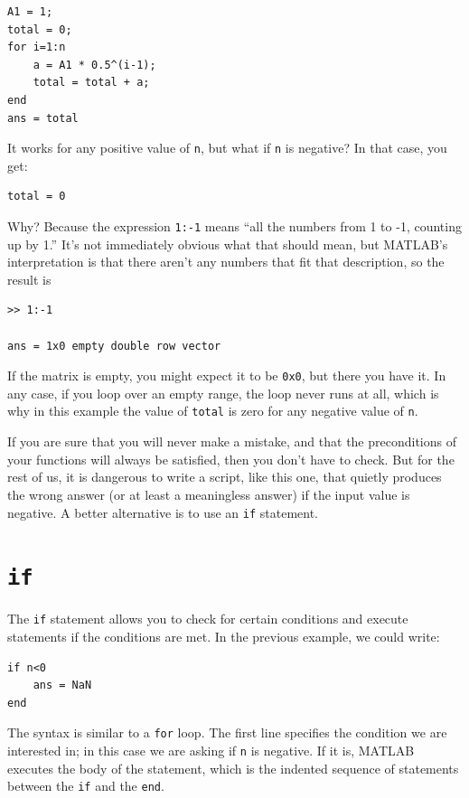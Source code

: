 \documentclass[
]{book}
\begin{document}
\begin{verbatim}
A1 = 1;
total = 0;
for i=1:n
    a = A1 * 0.5^(i-1);
    total = total + a;
end
ans = total
\end{verbatim}

It works for any positive value of {\tt n}, but what if {\tt n}
is negative?  In that case, you get:

\begin{verbatim}
total = 0
\end{verbatim}

Why?  Because the expression {\tt 1:-1} means ``all the numbers
from 1 to -1, counting up by 1.''  It's not immediately obvious
what that should mean, but MATLAB's interpretation is that there
aren't any numbers that fit that description, so the result is

\begin{verbatim}
>> 1:-1

ans = 1x0 empty double row vector
\end{verbatim}

If the matrix is empty, you might expect it to be {\tt 0x0}, but
there you have it.  In any case, if you loop over an empty range,
the loop never runs at all, which is why in this example the
value of {\tt total} is zero for any negative value of {\tt n}.

If you are sure that you will never make a mistake, and that the
preconditions of your functions will always be satisfied, then you
don't have to check.  But for the rest of us, it is dangerous to write
a script, like this one, that quietly produces the wrong answer (or
at least a meaningless answer) if the input value is negative.
A better alternative is to use an {\tt if} statement.


\section{{\tt if}}

The {\tt if} statement allows you to check for certain conditions
and execute statements if the conditions are met.  In the previous
example, we could write:

\begin{verbatim}
if n<0
    ans = NaN
end
\end{verbatim}

The syntax is similar to a {\tt for} loop.  The first line
specifies the condition we are interested in; in this case we
are asking if {\tt n} is negative.  If it is, MATLAB executes
the body of the statement, which is the indented sequence of
statements between the {\tt if} and the {\tt end}.
\end{document}
